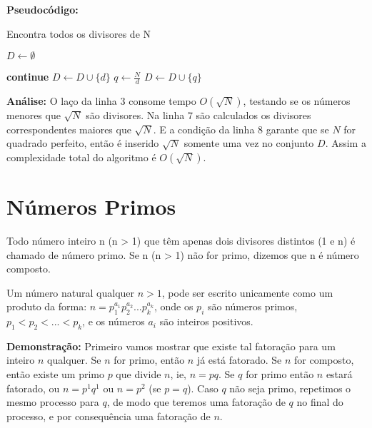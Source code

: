 \clearpage
\textbf{Pseudocódigo:}
\begin{algorithm}
\caption{Encontra todos os divisores de N}\label{encontra_divisores}
\begin{algorithmic}[1]
\State $D \gets \emptyset$ 


\State \textbf{continue}
\EndIf
\State $D \gets D \cup \{d\}$
\State $q \gets \frac{N}{d}$
\State $D \gets D \cup \{q\}$
\EndIf

\EndFor

\State {}
\EndProcedure
\end{algorithmic}
\end{algorithm}

\textbf{Análise:}
O laço da linha 3 consome tempo  $O(\sqrt{N})$, testando se os números menores que $\sqrt{N}$ são divisores. Na linha 7 são calculados os divisores correspondentes maiores 
que $\sqrt{N}$. E a condição da linha 8 garante que se $N$ for quadrado perfeito, então é inserido $\sqrt{N}$ somente uma vez no conjunto $D$.
Assim a complexidade total do algoritmo é $O(\sqrt{N})$.




\section{Números Primos}

\begin{definition} 
Todo número inteiro n (n > 1) que têm apenas dois divisores distintos (1 e n) é chamado de número primo. Se n (n > 1) não for primo, dizemos que n é número composto.
\end{definition}


\begin{theorem}\label{fatoracao_unica}
Um número natural qualquer $n>1$, pode ser escrito unicamente como um produto da forma: 
$n = p_1^{a_1}p_2^{a_2}...p_k^{a_k}$, onde os $p_i$ são números primos, $p_1 < p_2 < ... < p_k$, e os números $a_i$ são inteiros positivos.
\end{theorem}
\textbf{Demonstração:}
Primeiro vamos mostrar que existe tal fatoração para um inteiro $n$ qualquer. Se $n$ for primo, então $n$ já está fatorado. 
Se $n$ for composto, então existe um primo $p$ que divide $n$, ie, $n=pq$. Se $q$ for primo então $n$ estará fatorado,
 ou $n = p^1q^1$ ou $n = p^2$ (se $p=q$).
Caso $q$ não seja primo, repetimos o mesmo processo para $q$, de modo que teremos uma fatoração de $q$ no final do processo, e por
consequência uma fatoração de $n$.

